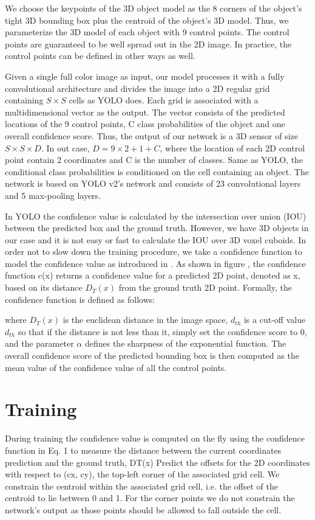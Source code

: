 We choose the keypoints of the 3D object model as the 8 corners of the object's tight 3D bounding box plus the centroid of the object's 3D model. Thus, we parameterize the 3D model of each object with 9 control points. The control points are guaranteed to be well spread out in the 2D image. In practice, the control points can be defined in other ways as well.

Given a single full color image as input, our model processes it with a fully convolutional architecture and divides the image into a 2D regular grid containing $ S \times S $ cells as YOLO does. Each grid is associated with a multidimensional vector as the output. The vector consists of the predicted locations of the 9 control points, C class probabilities of the object and one overall confidence score. Thus, the output of our network is a 3D sensor of size $ S \times S \times D $. In out case, $D = 9\times2+1+C$, where the location of each 2D control point contain 2 coordinates and C is the number of classes. Same as YOLO, the conditional class probabilities is  conditioned on the cell containing an object. The network is based on YOLO v2's network and consists of 23 convolutional layers and 5 max-pooling layers.

In YOLO the confidence value is calculated by the intersection over union (IOU) between the predicted box and the ground truth. However, we have 3D objects in our case and it is not easy or fast to calculate the IOU over 3D voxel cuboids. In order not to slow down the training procedure, we take a confidence function to model the confidence value as introduced in \cite{tekin2018real}. As shown in figure , the confidence function c(x) returns a confidence value for a predicted 2D point, denoted as x, based on its distance $ D_{T}(x) $ from the ground truth 2D point. Formally, the confidence function is defined as follows:


where $ D_{T}(x) $ is the euclidean distance in the image space, $ d_{th} $ is a cut-off value $ d_{th} $ so that if the distance is not less than it, simply set the confidence score to 0, and the parameter $ \alpha $ defines the sharpness of the exponential function. The overall confidence score of the predicted bounding box is then computed as the mean value of the confidence value of all the control points.

\section{Training}
During training the confidence value is computed on the fly using the confidence function in Eq. 1 to measure the distance between the current coordinates prediction and the ground truth, DT(x)
Predict the offsets for the 2D coordinates with respect to (cx, cy), the top-left corner of the associated grid cell.
We constrain the centroid within the associated grid cell, i.e. the offset of the centroid to lie between 0 and 1. For the corner points we do not constrain the network’s output as those points should be allowed to fall outside the cell.

